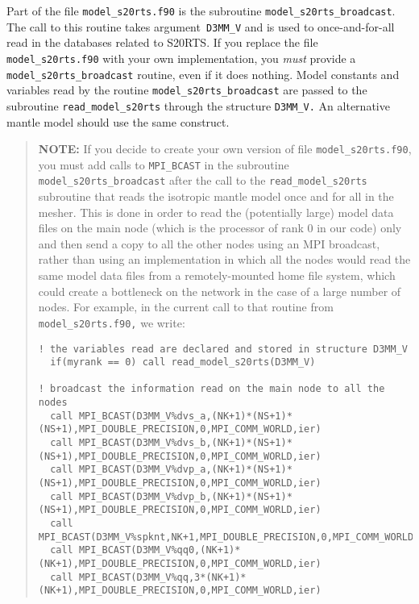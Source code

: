 Part of the file \texttt{model\_s20rts.f90} is the subroutine
\texttt{model\_s20rts\_broadcast}.
The call to this routine takes argument\texttt{ D3MM\_V} and is used
to once-and-for-all read in the databases related to S20RTS. If you
replace the file \texttt{model\_s20rts.f90} with your own implementation,
you \textit{must} provide a \texttt{model\_s20rts\_broadcast} routine,
even if it does nothing. Model constants and variables read by the
routine \texttt{model\_s20rts\_broadcast} are passed to the subroutine
\texttt{read\_model\_s20rts} through the structure \texttt{D3MM\_V.}
An alternative mantle model should use the same construct.

\begin{quote}
\textbf{NOTE:} If you decide to create your own version of file \texttt{model\_s20rts.f90},
you must add calls to \texttt{MPI\_BCAST} in the subroutine \texttt{model\_s20rts\_broadcast}
after the call to the \texttt{read\_model\_s20rts} subroutine that
reads the isotropic mantle model once and for all in the mesher. This
is done in order to read the (potentially large) model data files
on the main node (which is the processor of rank 0 in our code)
only and then send a copy to all the other nodes using an MPI broadcast,
rather than using an implementation in which all the nodes would read
the same model data files from a remotely-mounted home file system,
which could create a bottleneck on the network in the case of a large
number of nodes. For example, in the current call to that routine
from \texttt{model\_s20rts.f90,} we write:

{\footnotesize
\begin{verbatim}
! the variables read are declared and stored in structure D3MM_V
  if(myrank == 0) call read_model_s20rts(D3MM_V)

! broadcast the information read on the main node to all the nodes
  call MPI_BCAST(D3MM_V%dvs_a,(NK+1)*(NS+1)*(NS+1),MPI_DOUBLE_PRECISION,0,MPI_COMM_WORLD,ier)
  call MPI_BCAST(D3MM_V%dvs_b,(NK+1)*(NS+1)*(NS+1),MPI_DOUBLE_PRECISION,0,MPI_COMM_WORLD,ier)
  call MPI_BCAST(D3MM_V%dvp_a,(NK+1)*(NS+1)*(NS+1),MPI_DOUBLE_PRECISION,0,MPI_COMM_WORLD,ier)
  call MPI_BCAST(D3MM_V%dvp_b,(NK+1)*(NS+1)*(NS+1),MPI_DOUBLE_PRECISION,0,MPI_COMM_WORLD,ier)
  call MPI_BCAST(D3MM_V%spknt,NK+1,MPI_DOUBLE_PRECISION,0,MPI_COMM_WORLD,ier)
  call MPI_BCAST(D3MM_V%qq0,(NK+1)*(NK+1),MPI_DOUBLE_PRECISION,0,MPI_COMM_WORLD,ier)
  call MPI_BCAST(D3MM_V%qq,3*(NK+1)*(NK+1),MPI_DOUBLE_PRECISION,0,MPI_COMM_WORLD,ier)
\end{verbatim}
}
\end{quote}


